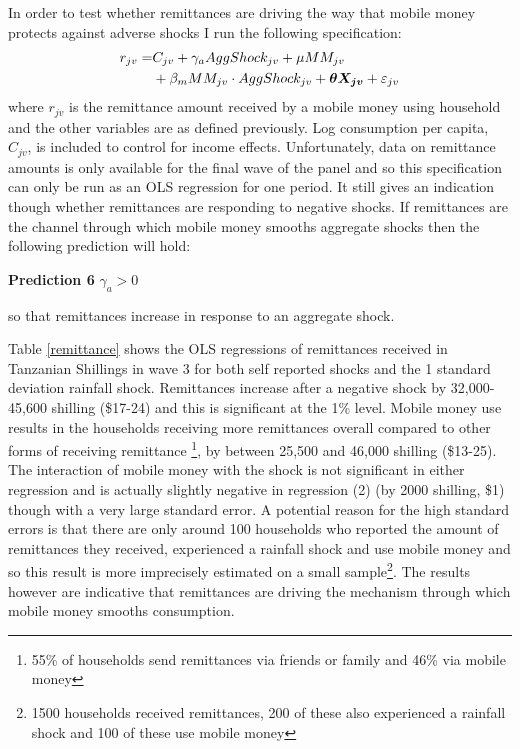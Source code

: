 In order to test whether remittances are driving the way that mobile money protects against adverse shocks I run the following specification: 
\begin{align}
r_{jv}=& C_{jv} + \gamma_a AggShock_{jv} + \mu MM_{jv} \notag \\ 
& + \beta_m MM_{jv}\cdot AggShock_{jv} + \bm{\theta X_{jv}} + \varepsilon_{jv} 
\end{align}
where $r_{jv}$ is the remittance amount received by a mobile money using household and the other variables are as defined previously. Log consumption per capita, $C_{jv}$, is included to control for income effects. Unfortunately, data on remittance amounts is only available for the final wave of the panel and so this specification can only be run as an OLS regression for one period. It still gives an indication though whether remittances are responding to negative shocks. If remittances are the channel through which mobile money smooths aggregate shocks then the following prediction will hold:
\begin{description}
\item{\bf{Prediction 6}} $\gamma_a>0$
\end{description}
so that remittances increase in response to an aggregate shock.   


Table \ref{remittance} shows the OLS regressions of remittances received in Tanzanian Shillings in wave 3 for both self reported shocks and the 1 standard deviation rainfall shock. Remittances increase after a negative shock by 32,000-45,600 shilling (\$17-24) and this is significant at the 1\% level. Mobile money use results in the households receiving more remittances overall compared to other forms of receiving remittance \footnote{55\% of households send remittances via friends or family and 46\% via mobile money}, by between 25,500 and 46,000 shilling (\$13-25). The interaction of mobile money with the shock is not significant in either regression and is actually slightly negative in regression (2) (by 2000 shilling, \$1) though with a very large standard error. A potential reason for the high standard errors is that there are only around 100 households who reported the amount of remittances they received, experienced a rainfall shock and use mobile money  and so this result is more imprecisely estimated on a small sample\footnote{1500 households received remittances, 200 of these also experienced a rainfall shock and 100 of these use mobile money}. The results however are indicative that remittances are driving the mechanism through which mobile money smooths consumption. 

